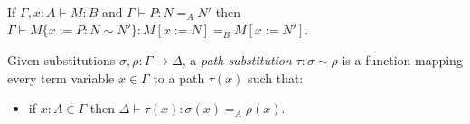 \begin{code}
\\
%
\\
\> \AgdaSymbol{:}  \AgdaSymbol{\{}\AgdaSymbol{\}} \AgdaSymbol{\{} \AgdaSymbol{:}  \AgdaSymbol{\}} \AgdaSymbol{\{}\AgdaSymbol{\}}      \AgdaSymbol{(}  \AgdaSymbol{)}\<%
\\
\>  \AgdaSymbol{=}  \AgdaSymbol{(}  \AgdaSymbol{(} \AgdaSymbol{(} \AgdaSymbol{)))} \AgdaSymbol{(}  \AgdaSymbol{(} \AgdaSymbol{(} \AgdaSymbol{)))}\<%
\end{code}

\begin{prop}
If $\Gamma, x : A \vdash M : B$ and $\Gamma \vdash P : N =_A N'$ then
$\Gamma \vdash M \{ x := P : N ∼ N' \} : M [ x:= N ] =_B M [ x:= N' ]$.
\end{prop}

Given substitutions $\sigma, \rho : \Gamma \rightarrow \Delta$, a \emph{path substitution} $\tau : \sigma \sim \rho$
is a function mapping every term variable $x \in \Gamma$ to a path $\tau(x)$ such that:
\begin{itemize}
\item
if $x : A \in \Gamma$ then $\Delta \vdash \tau(x) : \sigma(x) =_A \rho(x)$.
\end{itemize}

\begin{code}%
\> \AgdaSymbol{:}  \AgdaSymbol{\{}\AgdaSymbol{\}} \AgdaSymbol{\{}\AgdaSymbol{\}}                    \<%
\\
\>         \AgdaSymbol{=}                   \<%
\end{code}

